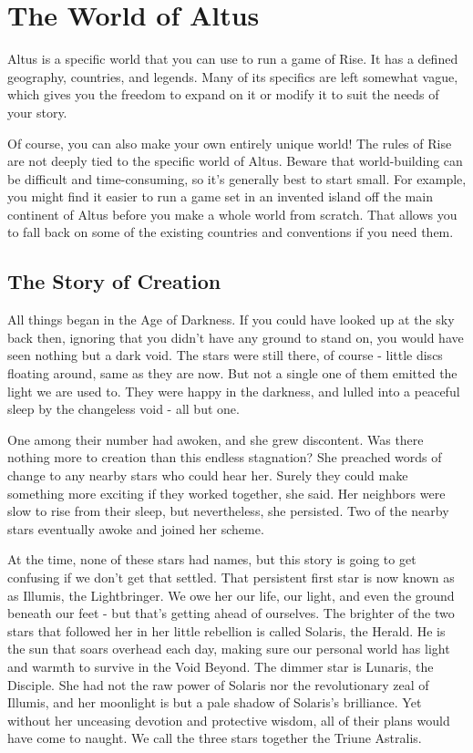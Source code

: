 \chapter{The World of Altus}

Altus is a specific world that you can use to run a game of Rise.
It has a defined geography, countries, and legends.
Many of its specifics are left somewhat vague, which gives you the freedom to expand on it or modify it to suit the needs of your story.

Of course, you can also make your own entirely unique world!
The rules of Rise are not deeply tied to the specific world of Altus.
Beware that world-building can be difficult and time-consuming, so it's generally best to start small.
For example, you might find it easier to run a game set in an invented island off the main continent of Altus before you make a whole world from scratch.
That allows you to fall back on some of the existing countries and conventions if you need them.

\section{The Story of Creation}

    All things began in the Age of Darkness.
    If you could have looked up at the sky back then, ignoring that you didn't have any ground to stand on, you would have seen nothing but a dark void.
    The stars were still there, of course - little discs floating around, same as they are now.
    But not a single one of them emitted the light we are used to.
    They were happy in the darkness, and lulled into a peaceful sleep by the changeless void - all but one.

    One among their number had awoken, and she grew discontent.
    Was there nothing more to creation than this endless stagnation?
    She preached words of change to any nearby stars who could hear her.
    Surely they could make something more exciting if they worked together, she said.
    Her neighbors were slow to rise from their sleep, but nevertheless, she persisted.
    Two of the nearby stars eventually awoke and joined her scheme.

    At the time, none of these stars had names, but this story is going to get confusing if we don't get that settled.
    That persistent first star is now known as as Illumis, the Lightbringer.
    We owe her our life, our light, and even the ground beneath our feet - but that's getting ahead of ourselves.
    The brighter of the two stars that followed her in her little rebellion is called Solaris, the Herald.
    He is the sun that soars overhead each day, making sure our personal world has light and warmth to survive in the Void Beyond.
    The dimmer star is Lunaris, the Disciple.
    She had not the raw power of Solaris nor the revolutionary zeal of Illumis, and her moonlight is but a pale shadow of Solaris's brilliance.
    Yet without her unceasing devotion and protective wisdom, all of their plans would have come to naught.
    We call the three stars together the Triune Astralis.


